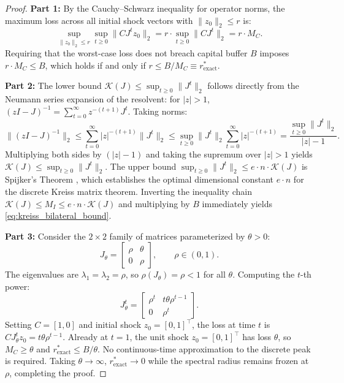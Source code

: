 \documentclass[12pt]{article}
\theoremstyle{definition}
\theoremstyle{remark}
\begin{document}
\begin{proof}
\textbf{Part 1:} By the Cauchy--Schwarz inequality for operator norms, the maximum loss across all initial shock vectors with $\|z_0\|_2 \le r$ is:
\begin{equation}
\sup_{\|z_0\|_2 \le r} \sup_{t \ge 0} \|C J^t z_0\|_2 = r \cdot \sup_{t \ge 0} \|C J^t\|_2 = r \cdot M_C.
\end{equation}
Requiring that the worst-case loss does not breach capital buffer $B$ imposes $r \cdot M_C \le B$, which holds if and only if $r \le B / M_C \equiv r^*_{\text{exact}}$.

\textbf{Part 2:} The lower bound $\mathcal{K}(J) \le \sup_{t \ge 0} \|J^t\|_2$ follows directly from the Neumann series expansion of the resolvent: for $|z| > 1$, $(zI - J)^{-1} = \sum_{t=0}^\infty z^{-(t+1)} J^t$. Taking norms:
\begin{equation}
\|(zI - J)^{-1}\|_2 \le \sum_{t=0}^\infty |z|^{-(t+1)} \|J^t\|_2 \le \sup_{t \ge 0} \|J^t\|_2 \sum_{t=0}^\infty |z|^{-(t+1)} = \frac{\sup_{t \ge 0} \|J^t\|_2}{|z| - 1}.
\end{equation}
Multiplying both sides by $(|z| - 1)$ and taking the supremum over $|z| > 1$ yields $\mathcal{K}(J) \le \sup_{t \ge 0} \|J^t\|_2$.
The upper bound $\sup_{t \ge 0} \|J^t\|_2 \le e \cdot n \cdot \mathcal{K}(J)$ is Spijker's Theorem \citep{spijker1991}, which establishes the optimal dimensional constant $e \cdot n$ for the discrete Kreiss matrix theorem.
Inverting the inequality chain $\mathcal{K}(J) \le M_I \le e \cdot n \cdot \mathcal{K}(J)$ and multiplying by $B$ immediately yields \eqref{eq:kreiss_bilateral_bound}.

\textbf{Part 3:} Consider the $2 \times 2$ family of matrices parameterized by $\theta > 0$:
\begin{equation}
J_\theta = \begin{bmatrix} \rho & \theta \\ 0 & \rho \end{bmatrix}, \qquad \rho \in (0, 1).
\end{equation}
The eigenvalues are $\lambda_1 = \lambda_2 = \rho$, so $\rho(J_\theta) = \rho < 1$ for all $\theta$.
Computing the $t$-th power:
\begin{equation}
J_\theta^t = \begin{bmatrix} \rho^t & t \theta \rho^{t-1} \\ 0 & \rho^t \end{bmatrix}.
\end{equation}
Setting $C = [1, 0]$ and initial shock $z_0 = [0, 1]^\top$, the loss at time $t$ is $C J_\theta^t z_0 = t \theta \rho^{t-1}$.
Already at $t=1$, the unit shock $z_0=[0,1]^\top$ has loss $\theta$, so $M_C\ge\theta$ and $r^*_{\text{exact}}\le B/\theta$. No continuous-time approximation to the discrete peak is required.
Taking $\theta \to \infty$, $r^*_{\text{exact}} \to 0$ while the spectral radius remains frozen at $\rho$, completing the proof.
\end{proof}
\end{document}
